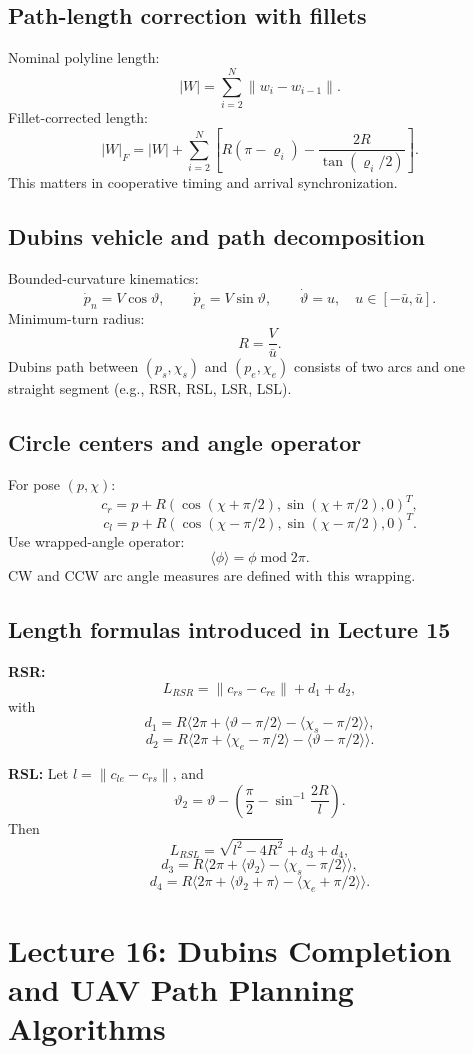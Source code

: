 \documentclass[11pt,a4paper]{article}
\begin{document}
\subsection{Path-length correction with fillets}
Nominal polyline length:
\[
|W|=\sum_{i=2}^{N}\|w_i-w_{i-1}\|.
\]
Fillet-corrected length:
\[
|W|_F
=|W|+\sum_{i=2}^{N}\left[
R(\pi-\varrho_i)-\frac{2R}{\tan(\varrho_i/2)}
\right].
\]
This matters in cooperative timing and arrival synchronization.

\subsection{Dubins vehicle and path decomposition}
Bounded-curvature kinematics:
\[
\dot p_n=V\cos\vartheta,\qquad
\dot p_e=V\sin\vartheta,\qquad
\dot\vartheta=u,\quad u\in[-\bar u,\bar u].
\]
Minimum-turn radius:
\[
R=\frac{V}{\bar u}.
\]
Dubins path between $(p_s,\chi_s)$ and $(p_e,\chi_e)$ consists of two arcs and one straight segment (e.g., RSR, RSL, LSR, LSL).

\subsection{Circle centers and angle operator}
For pose $(p,\chi)$:
\[
c_r=p+R(\cos(\chi+\pi/2),\sin(\chi+\pi/2),0)^T,
\]
\[
c_l=p+R(\cos(\chi-\pi/2),\sin(\chi-\pi/2),0)^T.
\]
Use wrapped-angle operator:
\[
\langle\phi\rangle=\phi\;\text{mod}\;2\pi.
\]
CW and CCW arc angle measures are defined with this wrapping.

\subsection{Length formulas introduced in Lecture 15}
\textbf{RSR:}
\[
L_{RSR}=\|c_{rs}-c_{re}\|+d_1+d_2,
\]
with
\[
d_1=R\langle 2\pi+\langle\vartheta-\pi/2\rangle-\langle\chi_s-\pi/2\rangle\rangle,
\]
\[
d_2=R\langle 2\pi+\langle\chi_e-\pi/2\rangle-\langle\vartheta-\pi/2\rangle\rangle.
\]

\textbf{RSL:}
Let $l=\|c_{le}-c_{rs}\|$, and
\[
\vartheta_2=\vartheta-\left(\frac{\pi}{2}-\sin^{-1}\frac{2R}{l}\right).
\]
Then
\[
L_{RSL}=\sqrt{l^2-4R^2}+d_3+d_4,
\]
\[
d_3=R\langle 2\pi+\langle\vartheta_2\rangle-\langle\chi_s-\pi/2\rangle\rangle,
\]
\[
d_4=R\langle 2\pi+\langle\vartheta_2+\pi\rangle-\langle\chi_e+\pi/2\rangle\rangle.
\]

\newpage
\section{Lecture 16: Dubins Completion and UAV Path Planning Algorithms}
\end{document}
